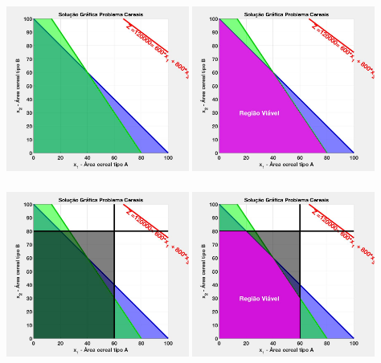\documentclass{beamer}
\begin{document}
\begin{frame}
\begin{columns}
\begin{column}{0.5\textwidth}
			\only<13> {\includegraphics[width=6cm,height=6cm]{MatLab/anima_11.png} }
			\only<14-15> {\includegraphics[width=6cm,height=6cm]{MatLab/anima_12.png} }
			\only<16> {\includegraphics[width=6cm,height=6cm]{MatLab/anima_13.png} }
			\only<17> {\includegraphics[width=6cm,height=6cm]{MatLab/anima_14.png} }

\end{column}
\end{columns}
\end{frame}
\end{document}
